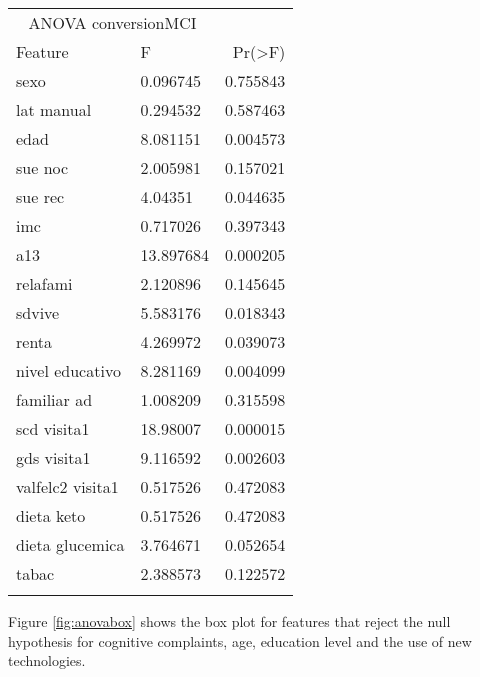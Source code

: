 \documentclass[11pt]{article}
\theoremstyle{definition}
\theoremstyle{remark}
\begin{document}
\begin{tabular}{llr}
\hline
\multicolumn{2}{c}{ANOVA conversionMCI} \\
\cline{1-2}
Feature    & F & Pr(>F) \\
\hline
sexo      & 0.096745   & 0.755843        \\
lat manual  & 0.294532 & 0.587463       \\
edad        & 8.081151 & 0.004573      \\
sue noc & 2.005981    & 0.157021       \\
sue rec & 4.04351     & 0.044635        \\
imc & 0.717026        & 0.397343        \\
a13 & 13.897684       & 0.000205        \\
relafami & 2.120896   & 0.145645        \\
sdvive & 5.583176     & 0.018343        \\
renta & 4.269972  & 0.039073      \\
nivel educativo & 8.281169     & 0.004099         \\
familiar ad & 1.008209       & 0.315598        \\
scd visita1 & 18.98007       & 0.000015       \\
gds visita1 & 9.116592       & 0.002603       \\
valfelc2 visita1 & 0.517526      & 0.472083       \\
dieta keto & 0.517526      & 0.472083       \\
dieta glucemica & 3.764671 & 0.052654 \\
tabac &  2.388573  & 0.122572 \\
\hline
\label{tab:anova}
\end{tabular}

Figure \ref{fig:anovabox} shows the box plot for features that reject the null hypothesis for cognitive complaints, age, education level and the use of new technologies.
\end{document}
